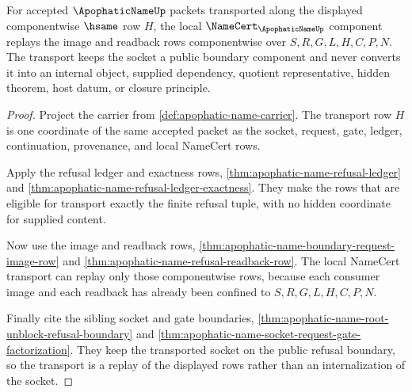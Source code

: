 \begin{theorem}
\label{thm:apophatic-name-componentwise-namecert-transport-row}
For accepted $\ApophaticNameUp$ packets transported along the displayed componentwise $\hsame$ row $H$, the local $\NameCert_{\ApophaticNameUp}$ component replays the image and readback rows componentwise over $S,R,G,L,H,C,P,N$. The transport keeps the socket a public boundary component and never converts it into an internal object, supplied dependency, quotient representative, hidden theorem, host datum, or closure principle.
\end{theorem}
\begin{proof}
Project the carrier from \autoref{def:apophatic-name-carrier}. The transport row $H$ is one coordinate of the same accepted packet as the socket, request, gate, ledger, continuation, provenance, and local NameCert rows.

Apply the refusal ledger and exactness rows, \autoref{thm:apophatic-name-refusal-ledger} and \autoref{thm:apophatic-name-refusal-ledger-exactness}. They make the rows that are eligible for transport exactly the finite refusal tuple, with no hidden coordinate for supplied content.

Now use the image and readback rows, \autoref{thm:apophatic-name-boundary-request-image-row} and \autoref{thm:apophatic-name-refusal-readback-row}. The local NameCert transport can replay only those componentwise rows, because each consumer image and each readback has already been confined to $S,R,G,L,H,C,P,N$.

Finally cite the sibling socket and gate boundaries, \autoref{thm:apophatic-name-root-unblock-refusal-boundary} and \autoref{thm:apophatic-name-socket-request-gate-factorization}. They keep the transported socket on the public refusal boundary, so the transport is a replay of the displayed rows rather than an internalization of the socket.
\end{proof}

